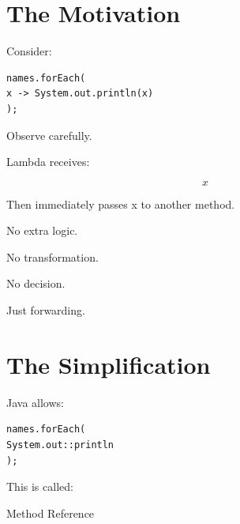 \documentclass[11pt,a4paper]{book}
\begin{document}

\section{The Motivation}

Consider:

\begin{verbatim} 
names.forEach(
x -> System.out.println(x)
);
\end{verbatim}


Observe carefully.


Lambda receives:

\[
x
\]


Then immediately passes x
to another method.


No extra logic.


No transformation.


No decision.


Just forwarding.


\section{The Simplification}

Java allows:

\begin{verbatim} 
names.forEach(
System.out::println
);
\end{verbatim}


This is called:


Method Reference
\end{document}

